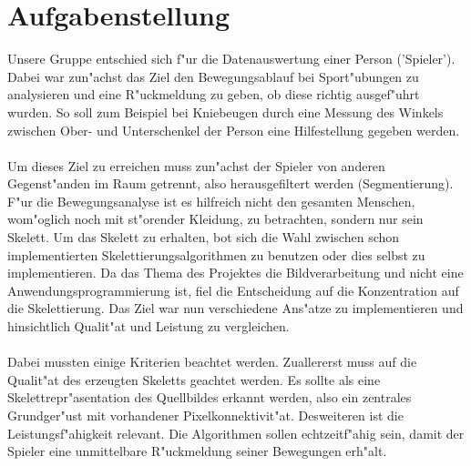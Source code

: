 \section{Aufgabenstellung}
\label{aufgabenstellung}
Unsere Gruppe entschied sich f"ur die Datenauswertung einer Person ('Spieler'). Dabei war zun"achst das Ziel den Bewegungsablauf bei Sport"ubungen zu analysieren und eine R"uckmeldung zu geben, ob diese richtig ausgef"uhrt wurden. So soll zum Beispiel bei Kniebeugen durch eine Messung des Winkels zwischen Ober- und Unterschenkel der Person eine Hilfestellung gegeben werden. \\ \\ 
Um dieses Ziel zu erreichen muss zun"achst der Spieler von anderen Gegenst"anden im Raum getrennt, also herausgefiltert werden (Segmentierung). F"ur die Bewegungsanalyse ist es hilfreich nicht den gesamten Menschen, wom"oglich noch mit st"orender Kleidung, zu betrachten, sondern nur sein Skelett. Um das Skelett zu erhalten, bot sich die Wahl zwischen schon implementierten Skelettierungsalgorithmen zu benutzen oder dies selbst zu implementieren. Da das Thema des Projektes die Bildverarbeitung und nicht eine Anwendungsprogrammierung ist, fiel die Entscheidung auf die Konzentration auf die Skelettierung. Das Ziel war nun verschiedene Ans"atze zu implementieren und hinsichtlich Qualit"at und Leistung zu vergleichen.  \\ \\
Dabei mussten einige Kriterien beachtet werden. Zuallererst muss auf die Qualit"at des erzeugten Skeletts geachtet werden. Es sollte als eine Skelettrepr"asentation des Quellbildes erkannt werden, also ein zentrales Grundger"ust mit vorhandener Pixelkonnektivit"at. Desweiteren ist die Leistungsf"ahigkeit relevant. Die Algorithmen sollen echtzeitf"ahig sein, damit der Spieler eine unmittelbare R"uckmeldung seiner Bewegungen erh"alt.
